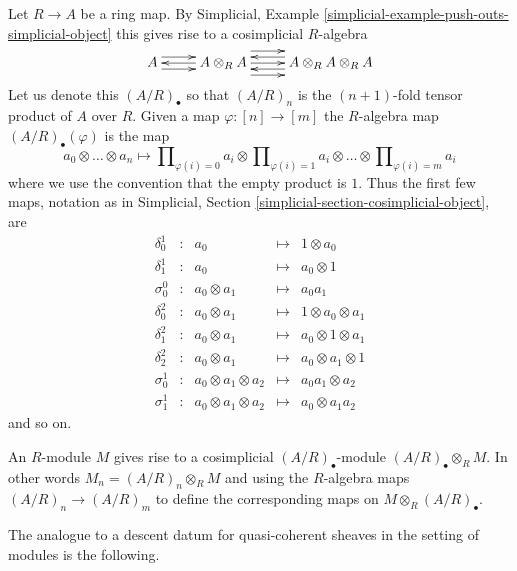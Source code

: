 \noindent
Let $R \to A$ be a ring map.
By Simplicial, Example \ref{simplicial-example-push-outs-simplicial-object}
this gives rise to a cosimplicial $R$-algebra
$$
\xymatrix{
A
\ar@<1ex>[r]
\ar@<-1ex>[r]
&
A\otimes_R A
\ar@<0ex>[l]
\ar@<2ex>[r]
\ar@<0ex>[r]
\ar@<-2ex>[r]
&
A \otimes_R A \otimes_R A
\ar@<1ex>[l]
\ar@<-1ex>[l]
}
$$
Let us denote this $(A/R)_\bullet$ so that $(A/R)_n$ is the $(n + 1)$-fold
tensor product of $A$ over $R$. Given a map
$\varphi : [n] \to [m]$ the $R$-algebra map $(A/R)_\bullet(\varphi)$
is the map
$$
a_0 \otimes \ldots \otimes a_n
\longmapsto
\prod\nolimits_{\varphi(i) = 0} a_i
\otimes
\prod\nolimits_{\varphi(i) = 1} a_i
\otimes \ldots \otimes
\prod\nolimits_{\varphi(i) = m} a_i
$$
where we use the convention that the empty product is $1$. Thus the first
few maps, notation as in
Simplicial, Section \ref{simplicial-section-cosimplicial-object}, are
$$
\begin{matrix}
\delta^1_0 & : & a_0 & \mapsto & 1 \otimes a_0 \\
\delta^1_1 & : & a_0 & \mapsto & a_0 \otimes 1 \\
\sigma^0_0 & : & a_0 \otimes a_1 & \mapsto & a_0a_1 \\
\delta^2_0 & : & a_0 \otimes a_1 & \mapsto & 1 \otimes a_0 \otimes a_1 \\
\delta^2_1 & : & a_0 \otimes a_1 & \mapsto & a_0 \otimes 1 \otimes a_1 \\
\delta^2_2 & : & a_0 \otimes a_1 & \mapsto & a_0 \otimes a_1 \otimes 1 \\
\sigma^1_0 & : & a_0 \otimes a_1 \otimes a_2 & \mapsto & a_0a_1 \otimes a_2 \\
\sigma^1_1 & : & a_0 \otimes a_1 \otimes a_2 & \mapsto & a_0 \otimes a_1a_2
\end{matrix}
$$
and so on.

\medskip\noindent
An $R$-module $M$ gives rise to a cosimplicial $(A/R)_\bullet$-module
$(A/R)_\bullet \otimes_R M$. In other words
$M_n = (A/R)_n \otimes_R M$ and using the $R$-algebra maps
$(A/R)_n \to (A/R)_m$ to define the corresponding maps on
$M \otimes_R (A/R)_\bullet$.

\medskip\noindent
The analogue to a descent datum
for quasi-coherent sheaves in the setting of modules is the following.

